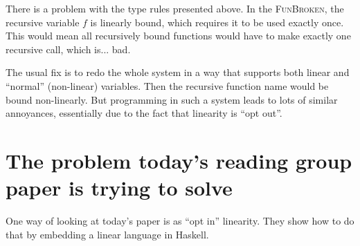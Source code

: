 \documentclass{article}
\begin{document}
There is a problem with the type rules presented above. In the
\textsc{FunBroken}, the recursive variable $f$ is linearly bound,
which requires it to be used exactly once. This would mean all
recursively bound functions would have to make exactly one recursive
call, which is... bad.

The usual fix is to redo the whole system in a way that supports both
linear and ``normal'' (non-linear) variables. Then the recursive
function name would be bound non-linearly. But programming in such a
system leads to lots of similar annoyances, essentially due to the
fact that linearity is ``opt out''.

\section*{The problem today's reading group paper is trying to solve}

One way of looking at today's paper is as ``opt in'' linearity.
They show how to do that by embedding a linear language in Haskell.
\end{document}

